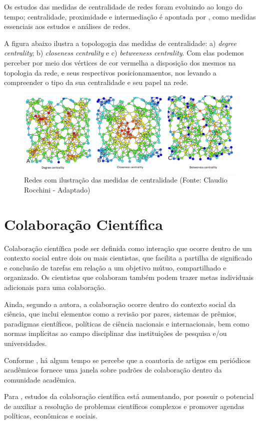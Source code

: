 Os estudos das medidas de centralidade de redes foram evoluindo ao longo do tempo; centralidade, proximidade e intermediação é apontada por \citep{freeman1996some}, como medidas essenciais aos estudos e análises de redes. 

A figura abaixo ilustra a topologogia das medidas de centralidade: a) \textit{degree centrality}; b) \textit{closeness centrality} e c) \textit{betweeness centrality}. Com elas podemos perceber por meio dos vértices de cor vermelha a disposição dos mesmos na topologia da rede, e seus respectivos posicionamaentos, nos levando a compreender o tipo da sua centralidade e seu papel na rede.

\begin{figure}[H]
\centering
\includegraphics[scale=0.5]{Imagens/Centrality.pdf}
\caption{Redes com ilustração das medidas de centralidade (Fonte: Claudio Rocchini - Adaptado)}
\label{centrality}
\end{figure}

\section{\textbf{Colaboração Científica}}\label{sec:colab} 

Colaboração científica pode ser definida como interação que ocorre dentro de um contexto social entre dois ou mais cientistas, que facilita a partilha de significado e conclusão de tarefas em relação a um objetivo mútuo, compartilhado e organizado. Os cientistas que colaboram também podem trazer metas individuais adicionais para uma colaboração. \citep{Sonnenwald}

Ainda, segundo a autora, a colaboração ocorre dentro do contexto social da ciência, que inclui elementos como a revisão por pares, sistemas de prêmios, paradigmas científicos, políticas de ciência nacionais e internacionais, bem como normas implícitas ao campo disciplinar das instituições de pesquisa e/ou universidades. 

Conforme \citep{Newman2004}, há algum tempo se percebe que a coautoria de artigos em periódicos acadêmicos fornece uma janela sobre padrões de colaboração dentro da comunidade acadêmica. 

Para \citep{Sonnenwald}, estudos da colaboração científica está aumentando, por possuir o potencial de auxiliar a resolução de problemas científicos complexos e promover agendas políticas, econômicas e sociais. 


